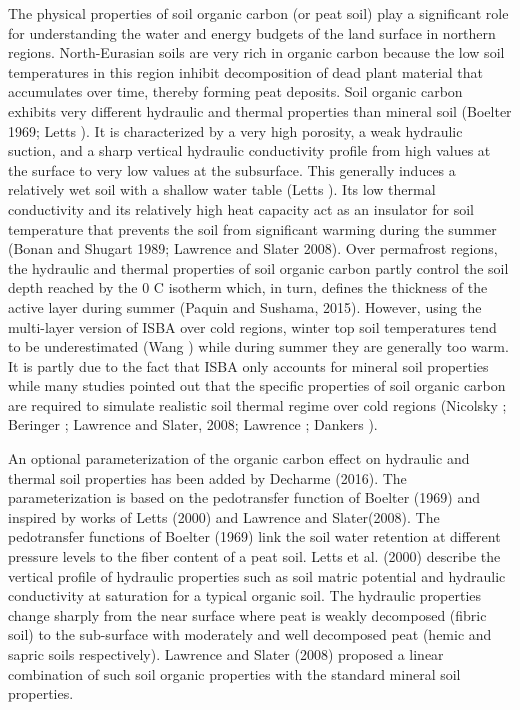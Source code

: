 The physical properties of soil organic carbon (or peat soil) play a
significant role for understanding the water and energy budgets of the
land surface in northern regions. North-Eurasian soils are very rich
in organic carbon because the low soil temperatures in this region
inhibit decomposition of dead plant material that accumulates over
time, thereby forming peat deposits. Soil organic carbon exhibits very
different hydraulic and thermal properties than mineral soil 
(Boelter 1969\nocite{Boelter_1969}; Letts \nocite{Letts_ea_2000}). 
It is characterized by a very high porosity,
a weak hydraulic suction, and a sharp vertical hydraulic conductivity
profile from high values at the surface to very low values at the
subsurface. This generally induces a relatively wet soil with a
shallow water table (Letts \nocite{Letts_ea_2000}). Its low thermal conductivity
and its relatively high heat capacity act as an insulator for soil
temperature that prevents the soil from significant warming during the
summer (Bonan and Shugart 1989\nocite{Bonnan_Shugart_1989}; 
Lawrence and Slater 2008\nocite{Lawrence_Slater_2008}). Over
permafrost regions, the hydraulic and thermal properties of soil
organic carbon partly control the soil depth reached by the 0 C
isotherm which, in turn, defines the thickness of the active layer
during summer (Paquin and Sushama, 2015\nocite{Paquin_Sushama_2015}). However, using the
multi-layer version of ISBA over cold regions, winter top soil
temperatures tend to be underestimated (Wang \nocite{Wang_ea_2016}) while during
summer they are generally too warm. It is partly due to the fact that
ISBA only accounts for mineral soil properties while many studies
pointed out that the specific properties of soil organic carbon are
required to simulate realistic soil thermal regime over cold regions
(Nicolsky \nocite{Nicolsky_ea_2007}; 
Beringer ; Lawrence and Slater, 2008\nocite{Lawrence_Slater_2008};
Lawrence \nocite{Lawrence_ea_2008}; Dankers \nocite{Dankers_ea_2011}). 

An optional 
parameterization of the organic carbon effect on hydraulic and thermal
soil properties has been added by Decharme \etal (2016\nocite{Decharme16}). The 
parameterization is based on the pedotransfer function of Boelter (1969)\nocite{Boelter_1969}
and inspired by works of Letts \etal (2000)\nocite{Letts_ea_2000} and 
Lawrence and Slater(2008)\nocite{Lawrence_Slater_2008}. 
The pedotransfer functions of Boelter (1969)\nocite{Boelter_1969} link the soil
water retention at different pressure levels to the fiber content of a
peat soil. Letts et al. (2000)\nocite{Letts_ea_2000} describe the vertical profile of
hydraulic properties such as soil matric potential and hydraulic
conductivity at saturation for a typical organic soil. The hydraulic
properties change sharply from the near surface where peat is weakly
decomposed (fibric soil) to the sub-surface with moderately and well
decomposed peat (hemic and sapric soils respectively). 
Lawrence and Slater (2008)\nocite{Lawrence_Slater_2008}
proposed a linear combination of such soil organic
properties with the standard mineral soil properties.



